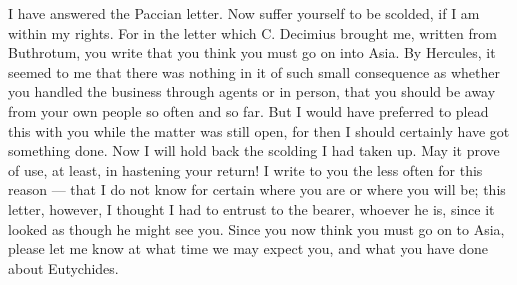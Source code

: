  I have answered the Paccian letter. Now suffer yourself to be scolded, if I am within my rights. For in the letter which C. Decimius brought me, written from Buthrotum, you write that you think you must go on into Asia. By Hercules, it seemed to me that there was nothing in it of such small consequence as whether you handled the business through agents or in person, that you should be away from your own people so often and so far. But I would have preferred to plead this with you while the matter was still open, for then I should certainly have got something done. Now I will hold back the scolding I had taken up. May it prove of use, at least, in hastening your return! I write to you the less often for this reason --- that I do not know for certain where you are or where you will be; this letter, however, I thought I had to entrust to the bearer, whoever he is, since it looked as though he might see you. Since you now think you must go on to Asia, please let me know at what time we may expect you, and what you have done about Eutychides.
